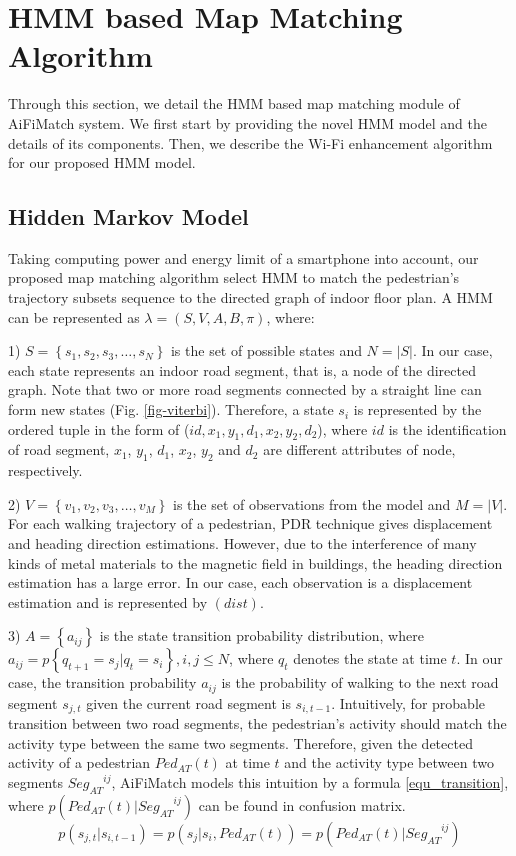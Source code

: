 \documentclass[conference]{IEEEtran}
\begin{document}
\section{HMM based Map Matching Algorithm}

Through this section, we detail the HMM based map matching module of AiFiMatch system. We first start by providing the novel HMM model and the details of its components. Then, we describe the Wi-Fi enhancement algorithm for our proposed HMM model.

\subsection{Hidden Markov Model}

Taking computing power and energy limit of a smartphone into account, our proposed map matching algorithm select HMM to match the pedestrian's trajectory subsets sequence to the directed graph of indoor floor plan. A HMM can be represented as $\lambda  = (S,V,A,B,\pi)$, where:

1) $S = \left\{ {{s_1},{s_2},{s_3}, \ldots ,{s_N}} \right\}$ is the set of possible states and $N = \left| S \right|$. In our case, each state represents an indoor road segment, that is, a node of the directed graph. Note that two or more road segments connected by a straight line can form new states (Fig. \ref{fig-viterbi}). Therefore, a state $s_i$ is represented by the ordered tuple in the form of ($id,x_{1},y_{1},d_{1},x_{2},y_{2},d_{2}$), where $id$ is the identification of road segment, $x_{1}$, $y_{1}$, $d_{1}$, $x_{2}$, $y_{2}$ and $d_{2}$ are different attributes of node, respectively. 

2) $V = \left\{ {{v_1},{v_2},{v_3}, \ldots ,{v_M}} \right\}$ is the set of observations from the model and $M = \left| V \right|$. For each walking trajectory of a pedestrian, PDR technique gives displacement and heading direction estimations. However, due to the interference of many kinds of metal materials to the magnetic field in buildings, the heading direction estimation has a large error. In our case, each observation is a displacement estimation and is represented by $(dist)$.

3) $A = \left\{ {{a_{ij}}} \right\}$ is the state transition probability distribution, where \\ ${a_{ij}} = p\left\{ {{q_{t + 1}} = {s_j}|{q_t} = {s_i}} \right\}, i, j \le N$, where ${q_t}$ denotes the state at time $t$. In our case, the transition probability $a_{ij}$ is the probability of walking to the next road segment $s_{j,t}$ given the current road segment is $s_{i,t-1}$. Intuitively, for probable transition between two road segments, the pedestrian's activity should match the activity type between the same two segments. Therefore, given the detected activity of a pedestrian ${Ped_{AT}}(t)$ at time $t$ and the activity type between two segments ${Seg_{AT}}^{ij}$, AiFiMatch models this intuition by a formula \ref{equ_transition}, where $p({Ped_{AT}}(t)|{Seg_{AT}}^{ij})$ can be found in confusion matrix.
\begin{equation}
\label{equ_transition}
p({s_{j,t}}|{s_{i,t - 1}}) = p({s_j}|{s_i},{Ped_{AT}}(t)) = p({Ped_{AT}}(t)|{Seg_{AT}}^{ij})
\end{equation}
\end{document}
